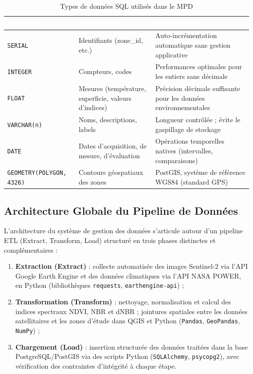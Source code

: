 \documentclass[12pt,a4paper]{report}
\begin{document}
\begin{table}[H]
\centering
{}
\begin{tabularx}{\textwidth}{L{3.5cm} L{4cm} X}
\toprule
{}
\textcolor{white}{\textbf{Type SQL}} &
\textcolor{white}{\textbf{Utilisation}} &
\textcolor{white}{\textbf{Justification}} \\
\midrule
\texttt{SERIAL}              & Identifiants (zone\_id, etc.) &
  Auto-incrémentation automatique sans gestion applicative \\
\texttt{INTEGER}             & Compteurs, codes &
  Performances optimales pour les entiers sans décimale \\
\texttt{FLOAT}               & Mesures (température, superficie, valeurs d'indices) &
  Précision décimale suffisante pour les données environnementales \\
\texttt{VARCHAR(n)}          & Noms, descriptions, labels &
  Longueur contrôlée ; évite le gaspillage de stockage \\
\texttt{DATE}                & Dates d'acquisition, de mesure, d'évaluation &
  Opérations temporelles natives (intervalles, comparaisons) \\
\texttt{GEOMETRY(POLYGON, 4326)} & Contours géospatiaux des zones &
  PostGIS, système de référence WGS84 (standard GPS) \\
\bottomrule
\end{tabularx}
\caption{Types de données SQL utilisés dans le MPD}
\label{tab:types_sql}
\end{table}

\subsection{Architecture Globale du Pipeline de Données}

L'architecture du système de gestion des données s'articule autour d'un pipeline ETL (Extract, Transform, Load) structuré en trois phases distinctes et complémentaires :

\begin{enumerate}
  \item \textbf{Extraction (Extract)} : collecte automatisée des images Sentinel-2 via l'API Google Earth Engine et des données climatiques via l'API NASA POWER, en Python (bibliothèques \texttt{requests}, \texttt{earthengine-api}) ;
  \item \textbf{Transformation (Transform)} : nettoyage, normalisation et calcul des indices spectraux NDVI, NBR et dNBR ; jointures spatiales entre les données satellitaires et les zones d'étude dans QGIS et Python (\texttt{Pandas}, \texttt{GeoPandas}, \texttt{NumPy}) ;
  \item \textbf{Chargement (Load)} : insertion structurée des données traitées dans la base PostgreSQL/PostGIS via des scripts Python (\texttt{SQLAlchemy}, \texttt{psycopg2}), avec vérification des contraintes d'intégrité à chaque étape.
\end{enumerate}
\end{document}
